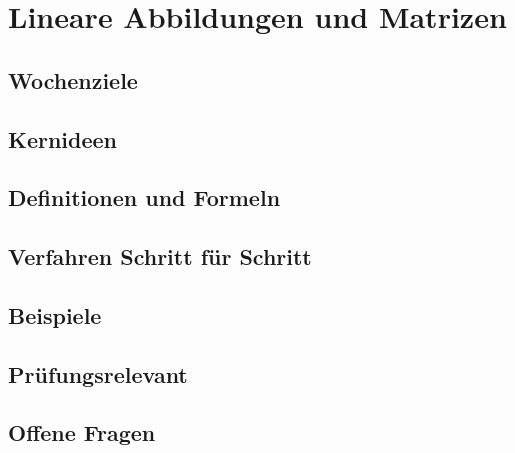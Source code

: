\chapter{Lineare Abbildungen und Matrizen}
\label{kap:05-lineare-abbildungen}

\section*{Wochenziele}
\begin{wochenziele}
\end{wochenziele}

\section{Kernideen}

\section{Definitionen und Formeln}

\section{Verfahren Schritt für Schritt}

\section{Beispiele}

\section{Prüfungsrelevant}

\section{Offene Fragen}
